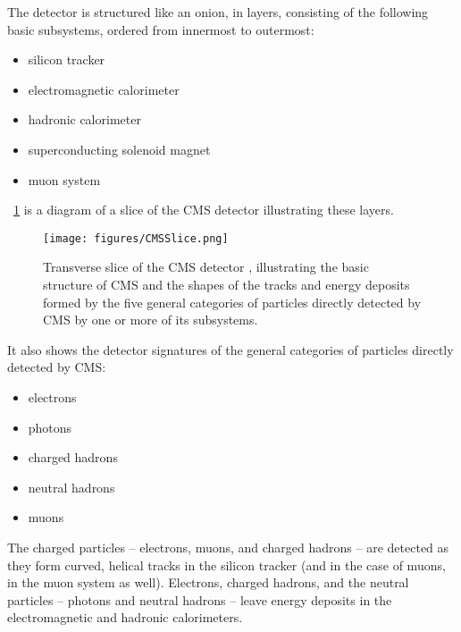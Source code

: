 The detector is structured like an onion, in layers, consisting of the following basic subsystems, ordered from innermost to outermost:
\begin{itemize}
  \item silicon tracker
  \item electromagnetic calorimeter
  \item hadronic calorimeter
  \item superconducting solenoid magnet
  \item muon system
\end{itemize}
\Fig~\ref{cms:interactive} is a diagram of a slice of the CMS detector illustrating these layers.
\begin{figure}[tpb]
  \centering
  \texttt{[image: figures/CMSSlice.png]}
  \caption{Transverse slice of the CMS detector \cite{Davis:2205172}, illustrating the basic structure of CMS and the shapes of the tracks and energy deposits formed by the five general categories of particles directly detected by CMS by one or more of its subsystems.}
  \label{cms:interactive}
\end{figure}
It also shows the detector signatures of the general categories of particles directly detected by CMS:
\begin{itemize}
  \item electrons
  \item photons
  \item charged hadrons
  \item neutral hadrons
  \item muons
\end{itemize}
The charged particles -- electrons, muons, and charged hadrons -- are detected as they form curved, helical tracks in the silicon tracker (and in the case of muons, in the muon system as well).
Electrons, charged hadrons, and the neutral particles -- photons and neutral hadrons -- leave energy deposits in the electromagnetic and hadronic calorimeters.

